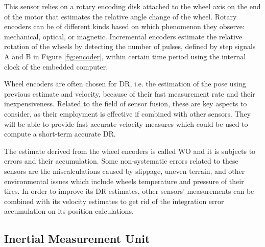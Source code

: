 This sensor relies on a rotary encoding disk attached to the wheel axis on the end of the motor that estimates the relative angle change of the wheel.
Rotary encoders can be of different kinds based on which phenomenon they observe: mechanical, optical, or magnetic.
Incremental encoders estimate the relative rotation of the wheels by detecting the number of pulses, defined by step signals A and B in Figure \ref{fig:encoder}, within certain time period using the internal clock of the embedded computer.

Wheel encoders are often chosen for \gls{DR}, i.e. the estimation of the pose using previous estimate and velocity, because of their fast measurement rate and their inexpensiveness.
Related to the field of sensor fusion, these are key aspects to consider, as their employment is effective if combined with other sensors. They will be able to provide fast accurate velocity measures which could be used to compute a short-term accurate \gls{DR}.

The estimate derived from the wheel encoders is called \gls{WO} and it is subjects to errors and their accumulation.
Some non-systematic errors related to these sensors are the miscalculations caused by slippage, uneven terrain, and other environmental issues which include wheels temperature and pressure of their tires.
In order to improve its \gls{DR} estimates, other sensors' measurements can be combined with its velocity estimates to get rid of the integration error accumulation on its position calculations.


\subsection{Inertial Measurement Unit}

